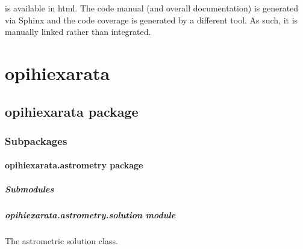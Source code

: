 \documentclass[letterpaper,11pt,english]{sphinxmanual}
\begin{document}
\sphinxAtStartPar
{}%
\begin{footnote}[78]\sphinxAtStartFootnote
{}
%
\end{footnote} is available in html. The code manual (and overall
documentation) is generated via Sphinx and the code coverage is generated by
a different tool. As such, it is manually linked rather than integrated.

\sphinxstepscope


\section{opihiexarata}
\label{\detokenize{code/modules:opihiexarata}}\label{\detokenize{code/modules::doc}}
\sphinxstepscope


\subsection{opihiexarata package}
\label{\detokenize{code/opihiexarata:opihiexarata-package}}\label{\detokenize{code/opihiexarata::doc}}

\subsubsection{Subpackages}
\label{\detokenize{code/opihiexarata:subpackages}}
\sphinxstepscope


\paragraph{opihiexarata.astrometry package}
\label{\detokenize{code/opihiexarata.astrometry:opihiexarata-astrometry-package}}\label{\detokenize{code/opihiexarata.astrometry::doc}}

\subparagraph{Submodules}
\label{\detokenize{code/opihiexarata.astrometry:submodules}}
\sphinxstepscope


\subparagraph{opihiexarata.astrometry.solution module}
\label{\detokenize{code/opihiexarata.astrometry.solution:module-opihiexarata.astrometry.solution}}\label{\detokenize{code/opihiexarata.astrometry.solution:opihiexarata-astrometry-solution-module}}\label{\detokenize{code/opihiexarata.astrometry.solution::doc}}
\sphinxAtStartPar
The astrometric solution class.
\end{document}
